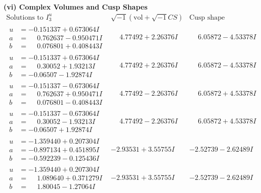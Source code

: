 \documentclass[1p]{elsarticle_modified}
\theoremstyle{definition}
\newcommand{\I}{\sqrt{-1}}
\begin{document}
\newpage\flushleft \textbf{(vi) Complex Volumes and Cusp Shapes}
$$\begin{array}{c|c|c}  
\text{Solutions to }I^u_{3}& \I (\text{vol} + \sqrt{-1}CS) & \text{Cusp shape}\\
 \hline 
\begin{aligned}
u &= -0.151337 + 0.673064 I \\
a &= \phantom{-}0.762637 - 0.950471 I \\
b &= \phantom{-}0.076801 + 0.408443 I\end{aligned}
 & \phantom{-}4.77492 + 2.26376 I & \phantom{-}6.05872 - 4.53378 I \\ \hline\begin{aligned}
u &= -0.151337 + 0.673064 I \\
a &= \phantom{-}0.30052 + 1.93213 I \\
b &= -0.06507 - 1.92874 I\end{aligned}
 & \phantom{-}4.77492 + 2.26376 I & \phantom{-}6.05872 - 4.53378 I \\ \hline\begin{aligned}
u &= -0.151337 - 0.673064 I \\
a &= \phantom{-}0.762637 + 0.950471 I \\
b &= \phantom{-}0.076801 - 0.408443 I\end{aligned}
 & \phantom{-}4.77492 - 2.26376 I & \phantom{-}6.05872 + 4.53378 I \\ \hline\begin{aligned}
u &= -0.151337 - 0.673064 I \\
a &= \phantom{-}0.30052 - 1.93213 I \\
b &= -0.06507 + 1.92874 I\end{aligned}
 & \phantom{-}4.77492 - 2.26376 I & \phantom{-}6.05872 + 4.53378 I \\ \hline\begin{aligned}
u &= -1.359440 + 0.207304 I \\
a &= -0.897134 + 0.451895 I \\
b &= -0.592239 - 0.125436 I\end{aligned}
 & -2.93531 + 3.55755 I & -2.52739 - 2.62489 I \\ \hline\begin{aligned}
u &= -1.359440 + 0.207304 I \\
a &= \phantom{-}1.089640 + 0.371279 I \\
b &= \phantom{-}1.80045 - 1.27064 I\end{aligned}
 & -2.93531 + 3.55755 I & -2.52739 - 2.62489 I \\ \hline\begin{aligned}

\end{aligned}
\end{array}$$
\end{document}
